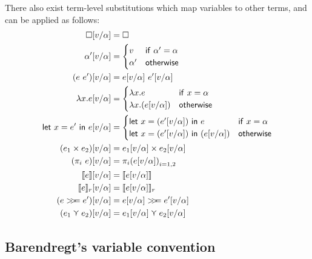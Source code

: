 There also exist term-level substitutions which map variables to
other terms, and can be applied as follows:
\begin{align*}
  \square [v/\alpha] &= \square \\
  \alpha' [v/\alpha] &=
             \begin{cases}
               v & \mathsf{if} \ \alpha' = \alpha \\
               \alpha' & \mathsf{otherwise}
             \end{cases} \\
  (e \ e') [v/\alpha] &= e[v/\alpha] \ e'[v/\alpha] \\
  \lambda x . e [v/\alpha] &=
                  \begin{cases}
                    \lambda x . e & \mathsf{if} \ x = \alpha \\
                    \lambda x . (e [v/\alpha]) & \mathsf{otherwise}
                  \end{cases} \\
  \letin{x = e'}{e} [v/\alpha] &=
                               \begin{cases}
                                 \letin{x = (e' [v/\alpha])}{e} & \mathsf{if} \
                                 x = \alpha \\
                                 \letin{x = (e' [v/\alpha])}{(e [v/\alpha])}
                                 & \mathsf{otherwise}
                               \end{cases} \\  
  (e_1 \times e_2) [v/\alpha] &= e_1[v/\alpha] \times e_2[v/\alpha] \\
  (\pi_i \ e) [v/\alpha] &= {\pi_i (e [v/\alpha])}_{i = 1, 2} \\
  \lift{e} [v/\alpha] &= \lift{e[v/\alpha]} \\
  \use{r}{e} [v/\alpha] &= \use{r}{e[v/\alpha]} \\
  (e \bind e') [v/\alpha] &= e[v/\alpha] \bind e'[v/\alpha] \\
  (e_1 \curlyvee e_2) [v/\alpha] &= e_1[v/\alpha] \curlyvee e_2 [v/\alpha]
\end{align*}

\subsection{Barendregt's variable convention}

